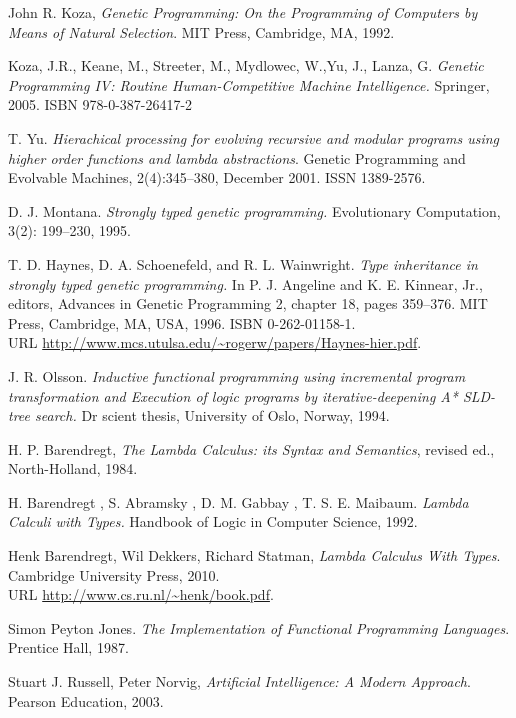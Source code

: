 \documentclass[12pt,a4paper]{report}
\begin{document}
\begin{thebibliography}{9}



  John R. Koza,
  \emph{Genetic Programming: On the Programming of Computers by Means of Natural Selection}.
  MIT Press, Cambridge, MA,
  1992. 

  Koza, J.R., Keane, M., Streeter, M., Mydlowec, W.,Yu, J., Lanza, G. 
  \emph{Genetic Programming IV: Routine Human-Competitive Machine Intelligence.} 
  Springer, 2005. ISBN 978-0-387-26417-2 

  T. Yu. 
  \emph{Hierachical processing for evolving recursive and modular 
        programs using higher order functions and lambda abstractions}. 
  Genetic Programming and Evolvable Machines,
  2(4):345–380, December 2001. ISSN 1389-2576.


D. J. Montana. 
\emph{Strongly typed genetic programming.} 
Evolutionary Computation, 3(2): 199–230, 1995.

T. D. Haynes, D. A. Schoenefeld, and R. L. Wainwright. 
\emph{Type inheritance in strongly typed genetic programming.} 
In P. J. Angeline and K. E. Kinnear, Jr., editors, Advances
in Genetic Programming 2, chapter 18, pages 359–376.
MIT Press, Cambridge, MA, USA, 1996. ISBN 0-262-01158-1.\\ 
URL 
\url{http://www.mcs.utulsa.edu/~rogerw/papers/Haynes-hier.pdf}.


J. R. Olsson. 
\emph{Inductive functional programming using incremental program 
transformation and Execution of logic programs by 
iterative-deepening A* SLD-tree search.} 
Dr scient thesis, University of Oslo, Norway, 1994.

H. P. Barendregt,
\emph{The Lambda Calculus: its Syntax and Semantics}, 
revised ed., North-Holland, 1984.

H. Barendregt , S. Abramsky , D. M. Gabbay , T. S. E. Maibaum.
\emph{Lambda Calculi with Types.} 
Handbook of Logic in Computer Science, 1992. 


  Henk Barendregt, Wil Dekkers, Richard Statman,
  \emph{Lambda Calculus With Types}.
  Cambridge University Press,
  2010. \\
  URL \url{http://www.cs.ru.nl/~henk/book.pdf}.

Simon Peyton Jones. 
\emph{The Implementation of Functional Programming Languages}. 
Prentice Hall, 1987.


	Stuart J. Russell, Peter Norvig,
	\emph{Artificial Intelligence: A Modern Approach}.
	Pearson Education,
	2003. 

\end{thebibliography}

	
	
\end{document}
